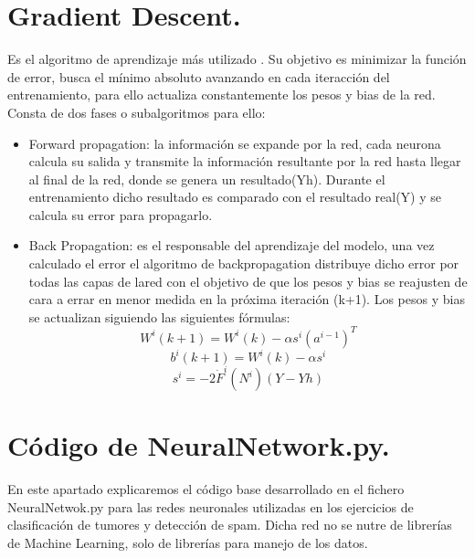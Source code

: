 \documentclass[a4paper,10pt]{article}
\begin{document}
\section{Gradient Descent.}
Es el algoritmo de aprendizaje más utilizado . Su objetivo es minimizar la función de error, busca el mínimo absoluto avanzando en cada iteracción del entrenamiento, para ello actualiza constantemente los pesos y bias de la red. Consta de dos fases o subalgoritmos para ello: 
\begin{itemize}
    \item Forward propagation: la información se expande por la red, cada neurona calcula su salida y transmite la información resultante por la red hasta llegar al final de la red, donde se genera un resultado(Yh). Durante el entrenamiento dicho resultado es comparado con el resultado real(Y) y se calcula su error para propagarlo.
    \item Back Propagation: es el responsable del aprendizaje del modelo, una vez calculado el error el algoritmo de backpropagation distribuye dicho error por todas las capas de lared con el objetivo de que los pesos y bias se reajusten de cara a errar en menor medida en la próxima iteración (k+1). Los pesos y bias se actualizan siguiendo las siguientes fórmulas:
    \[
    W^i (k+1) = W^i (k) - \alpha s^i (a^{i-1})^T
    \]
    \[
    b^i (k+1) = W^i (k) - \alpha s^i
    \]
    \[
    s^i = -2\dot{F}^i(N^i)(Y-Yh)
    \]
    
\end{itemize}
\newpage
\section{Código de NeuralNetwork.py.}
En este apartado explicaremos el código base desarrollado en el fichero NeuralNetwok.py para las redes neuronales utilizadas en los ejercicios de clasificación de tumores y detección de spam. Dicha red no se nutre de librerías de Machine Learning, solo de librerías para manejo de los datos.
\end{document}
